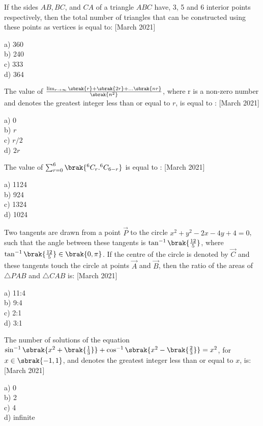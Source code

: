 \iffalse
\title{March 2021, shift 2}
\author{EE24BTECH11062}
\section{mcq-single}
\fi

\item If the sides $AB, BC$, and $CA$ of a triangle $ABC$ have, 3, 5 and 6 interior points respectively, then the total number of triangles that can be constructed using these points as vertices is equal to: \hfill{[March 2021]}
\begin{multicols}{4}
    a) 360\\
    b) 240\\
    c) 333\\
    d) 364
\end{multicols}
 \item The value of $\frac{\lim_{r \to \infty}\sbrak{r}+\sbrak{2r}+\dots\sbrak{nr}}{\sbrak{n^2}}$, where r is a non-zero number and  denotes the greatest integer less than or equal to $r$, is equal to : \hfill{[March 2021]}
 \begin{multicols}{4}
     a) 0\\
     b) $r$\\
     c) $r/2$\\
     d) $2r$
 \end{multicols}
 
 \item The value of $\sum_{r=0}^{6}\brak{^6C_r.^6C_{6-r}}$ is equal to : \hfill{[March 2021]}
 \begin{multicols}{4}
    a) 1124\\
    b) 924\\
    c) 1324\\
    d) 1024
 \end{multicols}
 
\item Two tangents are drawn from a point $\vec{P}$ to the circle $x^2 + y^2 -2x-4y+4=0$, such that the angle between these tangents is  $\tan^{-1}\brak{\frac{12}{5}}$, where $\tan^{-1}\brak{\frac{12}{5}}\in \brak{0,\pi}$. If the centre of the circle is denoted by $\vec{C}$ and these tangents touch the circle at points $\vec{A}$ and $\vec{B}$, then the ratio of the areas of $\triangle PAB$ and $\triangle CAB$ is: \hfill{[March 2021]}
\begin{multicols}{4}
    a) 11:4\\
    b) 9:4\\
    c) 2:1\\
    d) 3:1
\end{multicols}

\item The number of solutions of the equation $\sin^{-1}\sbrak{x^2+\brak{\frac{1}{3}}}+\cos^{-1}\sbrak{x^2-\brak{\frac{2}{3}}}=x^2$, for $x \in \sbrak{-1,1}$, and  denotes the greatest integer less than or equal to $x$, is: \hfill{[March 2021]}
\begin{multicols}{4}
    a) 0\\
    b) 2\\
    c) 4\\
    d) infinite
\end{multicols}
